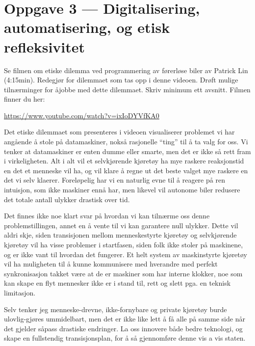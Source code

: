 \documentclass{../../myassignment}
\begin{document}
\section*{Oppgave 3 --- Digitalisering, automatisering, og etisk refleksivitet}
	\begin{problem}
		Se filmen om etiske dilemma ved programmering av førerløse biler av Patrick Lin (4:15min). Redegjør for dilemmaet som tas opp i denne videoen. Drøft mulige tilnærminger for åjobbe med dette dilemmaet. Skriv minimum ett avsnitt. Filmen finner du her: 

		\url{https://www.youtube.com/watch?v=ixIoDYVfKA0}
	\end{problem}

	\begin{answer}
		Det etiske dilemmaet som presenteres i videoen visualiserer problemet vi har angående å stole på datamaskiner, nokså rasjonelle ``ting'' til å ta valg for oss. Vi tenker at datamaskiner er enten dumme eller smarte, men det er ikke så rett fram i virkeligheten. Alt i alt vil et selvkjørende kjøretøy ha mye raskere reaksjonstid en det et menneske vil ha, og vil klare å regne ut det beste valget mye raskere en det vi selv klaerer. Foreløpelig har vi en naturlig evne til å reagere på ren intuisjon, som ikke maskiner ennå har, men likevel vil autonome biler redusere det totale antall ulykker drastisk over tid. 

		Det finnes ikke noe klart svar på hvordan vi kan tilnærme oss denne problemstillingen, annet en å vente til vi kan garantere null ulykker. Dette vil aldri skje, siden transisjonen mellom menneskestyrte kjøretøy og selvkjørende kjøretøy vil ha visse problemer i startfasen, siden folk ikke stoler på maskinene, og er ikke vant til hvordan det fungerer. Et helt system av maskinstyrte kjøretøy vil ha muligheten til å kunne kommunisere med hverandre med perfekt synkronisasjon takket være at de er maskiner som har interne klokker, noe som kan skape en flyt mennesker ikke er i stand til, rett og slett pga. en teknisk limitasjon. 

		Selv tenker jeg menneske-drevne, ikke-fornybare og private kjøretøy burde ulovlig-gjøres ummidelbart, men det er ikke like lett å få alle på samme side når det gjelder såpass drastiske endringer. La oss innovere både bedre teknologi, og skape en fullstendig transisjonsplan, for å så gjennomføre denne vis a vis staten. 
	\end{answer}
\end{document}
